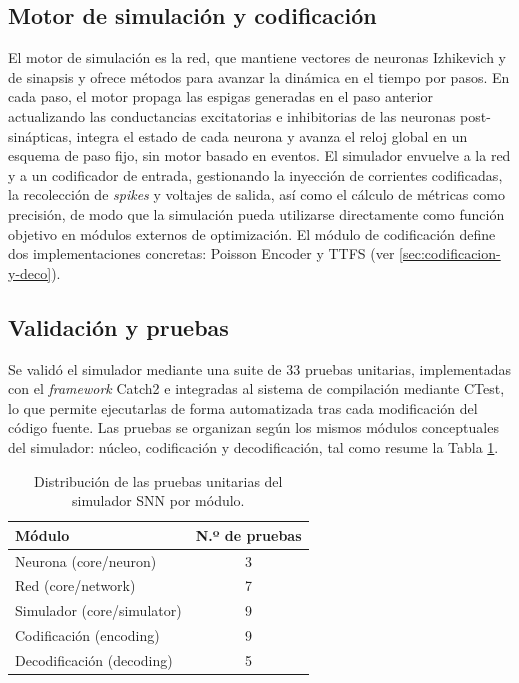 \subsection{Motor de simulación y codificación}
El motor de simulación es la red, que mantiene vectores de neuronas Izhikevich y de sinapsis y ofrece métodos para avanzar la dinámica en el tiempo por pasos. En cada paso, el motor propaga las espigas generadas en el paso anterior actualizando las conductancias excitatorias e inhibitorias de las neuronas post-sinápticas, integra el estado de cada neurona y avanza el reloj global en un esquema de paso fijo, sin motor basado en eventos. El simulador envuelve a la red y a un codificador de entrada, gestionando la inyección de corrientes codificadas, la recolección de \textit{spikes} y voltajes de salida, así como el cálculo de métricas como precisión, de modo que la simulación pueda utilizarse directamente como función objetivo en módulos externos de optimización. El módulo de codificación define dos implementaciones concretas: Poisson Encoder y TTFS (ver \ref{sec:codificacion-y-deco}).

\subsection{Validación y pruebas}
Se validó el simulador mediante una suite de 33 pruebas unitarias, implementadas con el \textit{framework} Catch2 e integradas al sistema de compilación mediante CTest, lo que permite ejecutarlas de forma automatizada tras cada modificación del código fuente. Las pruebas se organizan según los mismos módulos conceptuales del simulador: núcleo, codificación y decodificación, tal como resume la Tabla \ref{tab:pruebas_simulador}.

\begin{table}[hbtp]
    \centering
    \small
    \caption{Distribución de las pruebas unitarias del simulador SNN por módulo.}
    \label{tab:pruebas_simulador}
    \begin{tabular}{lc}
        \toprule
        Módulo & N.º de pruebas \\
        \midrule
        Neurona (core/neuron) & 3 \\
        Red (core/network) & 7 \\
        Simulador (core/simulator) & 9 \\
        Codificación (encoding) & 9 \\
        Decodificación (decoding) & 5 \\
        \bottomrule
    \end{tabular}
\end{table}

